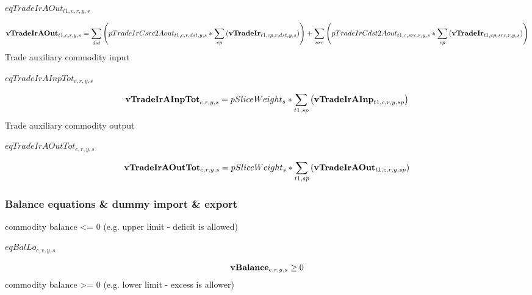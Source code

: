 \documentclass{article}
\begin{document}
$eqTradeIrAOut_{t1,c,r,y,s}$





\begin{dmath} 
{\bf vTradeIrAOut}_{t1,c,r,y,s}  =  \sum_{dst}{\left(pTradeIrCsrc2Aout_{t1,c,r,dst,y,s}*\sum_{cp}{\left({\bf vTradeIr}_{t1,cp,r,dst,y,s}\right)}\right)}+\sum_{src}{\left(pTradeIrCdst2Aout_{t1,c,src,r,y,s}*\sum_{cp}{\left({\bf vTradeIr}_{t1,cp,src,r,y,s}\right)}\right)}
\end{dmath} 
Trade auxiliary commodity input







$eqTradeIrAInpTot_{c,r,y,s}$





\begin{dmath} 
{\bf vTradeIrAInpTot}_{c,r,y,s}  =  pSliceWeight_{s}*\sum_{t1,sp}{\left({\bf vTradeIrAInp}_{t1,c,r,y,sp}\right)}
\end{dmath} 
Trade auxiliary commodity output







$eqTradeIrAOutTot_{c,r,y,s}$





\begin{dmath} 
{\bf vTradeIrAOutTot}_{c,r,y,s}  =  pSliceWeight_{s}*\sum_{t1,sp}{\left({\bf vTradeIrAOut}_{t1,c,r,y,sp}\right)}
\end{dmath} 
\subsubsection*{Balance equations \& dummy import \& export}
commodity balance <= 0 (e.g. upper limit - deficit is allowed)







$eqBalLo_{c,r,y,s}$





\begin{dmath} 
{\bf vBalance}_{c,r,y,s}  \ge  0
\end{dmath} 
commodity balance >= 0 (e.g. lower limit - excess is allower)
\end{document}
